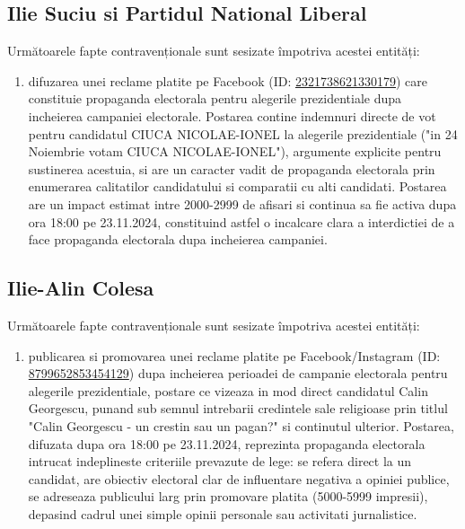\documentclass[a4paper,12pt]{article}
\begin{document}
\vspace{0.5cm}

\subsection{Ilie Suciu si Partidul National Liberal}
Următoarele fapte contravenționale sunt sesizate împotriva acestei entități:

\begin{enumerate}[leftmargin=*, label=\arabic*.)]
    \item difuzarea unei reclame platite pe Facebook (ID: \href{https://www.facebook.com/ads/library/?id=2321738621330179}{2321738621330179}) care constituie propaganda electorala pentru alegerile prezidentiale dupa incheierea campaniei electorale. Postarea contine indemnuri directe de vot pentru candidatul CIUCA NICOLAE-IONEL la alegerile prezidentiale ("in 24 Noiembrie votam CIUCA NICOLAE-IONEL"), argumente explicite pentru sustinerea acestuia, si are un caracter vadit de propaganda electorala prin enumerarea calitatilor candidatului si comparatii cu alti candidati. Postarea are un impact estimat intre 2000-2999 de afisari si continua sa fie activa dupa ora 18:00 pe 23.11.2024, constituind astfel o incalcare clara a interdictiei de a face propaganda electorala dupa incheierea campaniei.
\end{enumerate}

\vspace{0.5cm}

\subsection{Ilie-Alin Colesa}
Următoarele fapte contravenționale sunt sesizate împotriva acestei entități:

\begin{enumerate}[leftmargin=*, label=\arabic*.)]
    \item publicarea si promovarea unei reclame platite pe Facebook/Instagram (ID: \href{https://www.facebook.com/ads/library/?id=8799652853454129}{8799652853454129}) dupa incheierea perioadei de campanie electorala pentru alegerile prezidentiale, postare ce vizeaza in mod direct candidatul Calin Georgescu, punand sub semnul intrebarii credintele sale religioase prin titlul "Calin Georgescu - un crestin sau un pagan?" si continutul ulterior. Postarea, difuzata dupa ora 18:00 pe 23.11.2024, reprezinta propaganda electorala intrucat indeplineste criteriile prevazute de lege: se refera direct la un candidat, are obiectiv electoral clar de influentare negativa a opiniei publice, se adreseaza publicului larg prin promovare platita (5000-5999 impresii), depasind cadrul unei simple opinii personale sau activitati jurnalistice.
\end{enumerate}
\end{document}
